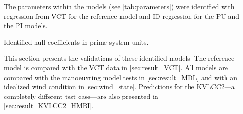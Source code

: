 The parameters within the models (see \autoref{tab:parameters}) were identified with regression from VCT for the reference model and ID regression for the PU and the PI models. 
\begin{table}[h]
    \centering
    \caption{Identified hull coefficients in prime system units.}
    \label{tab:parameters}
\end{table}

This section presents the validations of these identified models. The reference model is compared with the VCT data in \autoref{sec:result_VCT}. All models are compared with the manoeuvring model tests \citep{alexandersson_system_2022,alexandersson_wpcc_2024} in \autoref{sec:result_MDL} and with an idealized wind condition in \autoref{sec:wind_state}.
Predictions for the KVLCC2---a completely different test case---are also presented in \autoref{sec:result_KVLCC2_HMRI}.